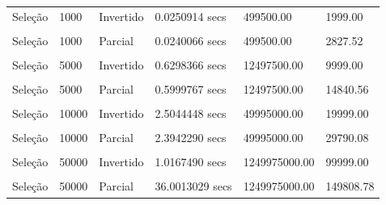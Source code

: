 \documentclass[
]{article}
\begin{document}
\begin{longtable}[l]{llllll}
Seleção & 1000 & Invertido & 0.0250914 secs & 499500.00 & 1999.00\\
\cellcolor{gray!15}{Seleção} & \cellcolor{gray!15}{1000} & \cellcolor{gray!15}{Ordenado} & \cellcolor{gray!15}{0.0242286 secs} & \cellcolor{gray!15}{499500.00} & \cellcolor{gray!15}{999.00}\\
Seleção & 1000 & Parcial & 0.0240066 secs & 499500.00 & 2827.52\\
\cellcolor{gray!15}{Seleção} & \cellcolor{gray!15}{5000} & \cellcolor{gray!15}{Aleatório} & \cellcolor{gray!15}{0.5993001 secs} & \cellcolor{gray!15}{12497500.00} & \cellcolor{gray!15}{14980.26}\\
Seleção & 5000 & Invertido & 0.6298366 secs & 12497500.00 & 9999.00\\
\cellcolor{gray!15}{Seleção} & \cellcolor{gray!15}{5000} & \cellcolor{gray!15}{Ordenado} & \cellcolor{gray!15}{0.5931146 secs} & \cellcolor{gray!15}{12497500.00} & \cellcolor{gray!15}{4999.00}\\
Seleção & 5000 & Parcial & 0.5999767 secs & 12497500.00 & 14840.56\\
\cellcolor{gray!15}{Seleção} & \cellcolor{gray!15}{10000} & \cellcolor{gray!15}{Aleatório} & \cellcolor{gray!15}{2.3946125 secs} & \cellcolor{gray!15}{49995000.00} & \cellcolor{gray!15}{29979.50}\\
Seleção & 10000 & Invertido & 2.5044448 secs & 49995000.00 & 19999.00\\
\cellcolor{gray!15}{Seleção} & \cellcolor{gray!15}{10000} & \cellcolor{gray!15}{Ordenado} & \cellcolor{gray!15}{2.3760064 secs} & \cellcolor{gray!15}{49995000.00} & \cellcolor{gray!15}{9999.00}\\
Seleção & 10000 & Parcial & 2.3942290 secs & 49995000.00 & 29790.08\\
\cellcolor{gray!15}{Seleção} & \cellcolor{gray!15}{50000} & \cellcolor{gray!15}{Aleatório} & \cellcolor{gray!15}{40.1216324 secs} & \cellcolor{gray!15}{1249975000.00} & \cellcolor{gray!15}{149976.26}\\
Seleção & 50000 & Invertido & 1.0167490 secs & 1249975000.00 & 99999.00\\
\cellcolor{gray!15}{Seleção} & \cellcolor{gray!15}{50000} & \cellcolor{gray!15}{Ordenado} & \cellcolor{gray!15}{59.5748768 secs} & \cellcolor{gray!15}{1249975000.00} & \cellcolor{gray!15}{49999.00}\\
Seleção & 50000 & Parcial & 36.0013029 secs & 1249975000.00 & 149808.78\\*
\end{longtable}
\end{document}
